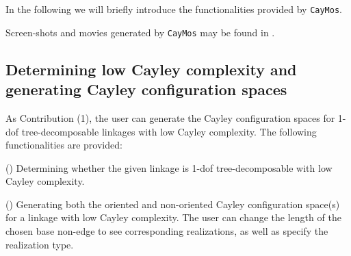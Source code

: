 \documentclass[prodmode,acmtoms]{acmsmall}
\begin{document}
In the following we will briefly introduce the functionalities provided by \texttt{CayMos}.

\smallskip

Screen-shots and movies generated by \texttt{CayMos}  may be found in  .







\subsection{Determining low Cayley complexity and generating Cayley configuration spaces}\label{subsec:ccs}
% 
%
As  Contribution (1), 
the user can generate the Cayley configuration spaces for 1-dof tree-decomposable linkages with low Cayley complexity. 
The following functionalities are provided: %

\noindent() Determining whether the given linkage is 1-dof tree-decomposable with low Cayley complexity. %

\noindent() Generating both the oriented and non-oriented Cayley configuration space(s)
for a linkage with low Cayley complexity. 
The user can change the length of the chosen base non-edge to see corresponding realizations, as well as specify the realization type.
\end{document}
